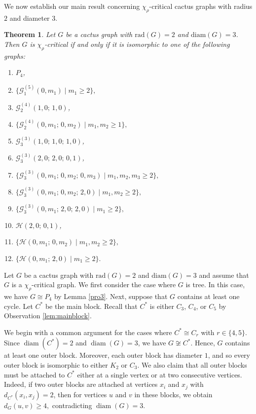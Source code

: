 \documentclass[12pt]{article}
\newtheorem{theorem}{Theorem}[section]
\newcommand{\proof}{\noindent{\bf Proof.\ }}
\begin{document}
We now establish our main result concerning $\chi_{\rho}$-critical cactus graphs with radius $2$ and diameter $3$. 

\begin{theorem}\label{teo4}
Let $G$ be a cactus graph with $\mathrm{rad}(G) = 2$  and  $\mathrm{diam}(G) = 3$. Then $G$ is $\chi_{\rho}$-critical if and only if it is isomorphic to one of the following graphs:
\begin{enumerate}[label=(\roman*)]
\item $P_{4}$,
\item $\{\mathcal{G}_{1}^{(5)}(0,m_{1}) \mid m_{1} \ge 2\},$
\item $\mathcal{G}_{2}^{(4)}(1,0;\,1,0)$,
\item $\{\mathcal{G}_{2}^{(4)}(0,m_{1};\,0,m_{2}) \mid m_{1},m_{2} \ge 1\},$
\item $\mathcal{G}_{3}^{(3)}(1,0;\,1,0;\,1,0)$,
\item $\mathcal{G}_{3}^{(3)}(2,0;\,2,0;\,0,1)$,
\item $\{\mathcal{G}_{3}^{(3)}(0,m_{1};\,0,m_{2};\,0,m_{3}) \mid m_{1},m_{2},m_{3} \ge 2\},$
\item $\{\mathcal{G}_{3}^{(3)}(0,m_{1};\,0,m_{2};\,2,0) \mid m_{1},m_{2} \ge 2\},$
\item $\{\mathcal{G}_{3}^{(3)}(0,m_{1};\,2,0;\,2,0) \mid m_{1} \ge 2\},$
\item $\mathcal{H}(2,0;\,0,1)$,
\item $\{\mathcal{H}(0,m_{1};\,0,m_{2}) \mid m_{1},m_{2} \ge 2\},$
\item $\{\mathcal{H}(0,m_{1};\,2,0) \mid m_{1} \ge 2\}.$
\end{enumerate}
\end{theorem}

\proof Let \( G \) be a  cactus graph with $\mathrm{rad}(G) = 2$  and  $\mathrm{diam}(G) = 3$ and assume that $G$ is a $\chi_{\rho}$-critical graph. We first consider the case where \( G \) is tree. In this case, we have \( G \cong P_4 \) by Lemma \ref{pro3}. Next, suppose that \( G \) contains at least one cycle. Let $C^*$ be the main block. Recall that $C^*$ is either $C_3$, $C_4$, or $C_5$ by Observation \ref{lem:mainblock}. 

We begin with a common argument for the cases where $C^* \cong C_r$ with $r \in \{4,5\}$.
Since $\operatorname{diam}(C^*)=2$ and $\operatorname{diam}(G)=3$, we have $G \not\cong C^*$. Hence, $G$ contains at least one outer block. Moreover, each outer block has diameter $1$, and so every outer block is isomorphic to either $K_2$ or $C_3$. We also claim that all outer blocks must be attached to $C^*$ either at a single vertex or at two consecutive vertices. Indeed, if two outer blocks are attached at vertices $x_i$ and $x_j$ with $d_{C^*}(x_i,x_j)=2$, then for vertices $u$ and $v$ in these blocks, we obtain $d_G(u,v) \ge 4,$
contradicting $\operatorname{diam}(G)=3$.
	
\end{document}
